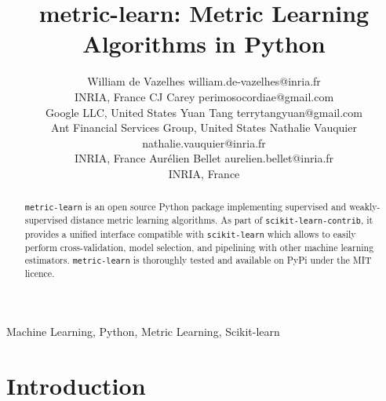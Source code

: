 \documentclass[twoside,11pt]{article}
\begin{document}
\title{metric-learn: Metric Learning Algorithms in Python}

\author{\name William de Vazelhes \email william.de-vazelhes@inria.fr \\
       \addr INRIA, France
       \AND
       \name CJ Carey \email perimosocordiae@gmail.com \\
       \addr Google LLC, United States
       \AND
       \name Yuan Tang \email terrytangyuan@gmail.com \\
       \addr Ant Financial Services Group, United States
       \AND
       \name Nathalie Vauquier \email nathalie.vauquier@inria.fr \\
       \addr INRIA, France
       \AND
       \name Aur\'elien Bellet \email aurelien.bellet@inria.fr \\
       \addr INRIA, France
       }

\editor{}

\maketitle

\begin{abstract}%
\texttt{metric-learn} is an open source Python package implementing supervised and weakly-supervised distance metric learning algorithms. As part of \texttt{scikit-learn-contrib}, it provides a unified interface compatible with \texttt{scikit-learn} which allows to easily perform cross-validation, model selection, and pipelining with other machine learning estimators. \texttt{metric-learn} is thoroughly tested and available on PyPi under the MIT licence.
\end{abstract}

\begin{keywords}
  Machine Learning, Python, Metric Learning, Scikit-learn
\end{keywords}

\section{Introduction}
\end{document}
